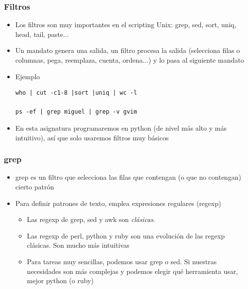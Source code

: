 \documentclass[ucs]{beamer}
\begin{document}
\begin{frame}[fragile]
\frametitle{Filtros}

\begin{itemize} 
\item
Los filtros son muy importantes en el scripting Unix:
grep, sed, sort, uniq, head, tail,  paste...
\item
Un mandato genera una salida, un filtro procesa la salida (selecciona filas o columnas, pega, reemplaza, cuenta,
ordena...) y lo pasa al siguiente mandato
\item


Ejemplo

\begin{footnotesize}
\begin{verbatim}
who | cut -c1-8 |sort |uniq | wc -l

ps -ef | grep miguel | grep -v gvim
\end{verbatim}
\end{footnotesize}



\item
En esta asignatura programaremos en python (de nivel más alto y más intuitivo), así que solo usaremos
filtros muy básicos
\end{itemize} 


\end{frame}
\begin{frame}[fragile]
\frametitle{grep}

\begin{itemize} 
\item
grep es un filtro que selecciona las filas que contengan (o que no contengan) cierto patrón
\item
Para definir patrones de texto, emplea expresiones regulares (regexp)
\begin{itemize} 
\item
Las regexp de grep, sed y awk son \emph{clásicas}. 
\item
Las regexp de perl, python y ruby son una evolución de las regexp clásicas. Son mucho más intuitivas
\item
Para tareas muy sencillas, podemos usar grep o sed. Si nuestras necesidades son más complejas y podemos
elegir qué herramienta usar, mejor python (o ruby)
\end{itemize}
\end{itemize}

\end{frame}
\end{document}
